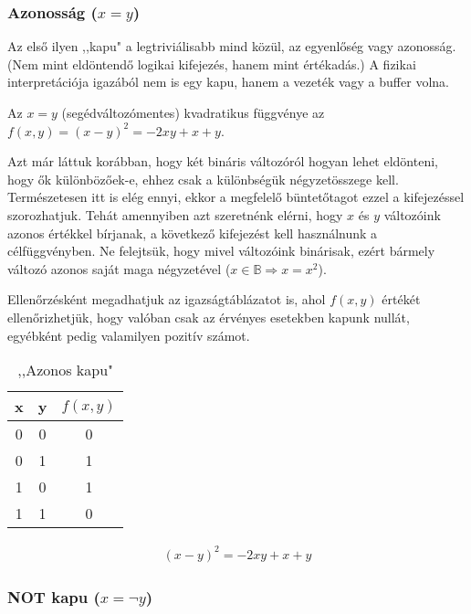 \subsubsection{Azonosság ($x=y$)}

Az első ilyen ,,kapu" a legtriviálisabb mind közül, az egyenlőség vagy azonosság. (Nem mint eldöntendő logikai kifejezés, hanem mint értékadás.) A fizikai interpretációja igazából nem is egy kapu, hanem a vezeték vagy a buffer volna. 

\begin{allitas}
	Az $x=y$ (segédváltozómentes) kvadratikus függvénye az $f(x,y)=(x-y)^2=-2xy+x+y$.
	
	Azt már láttuk korábban, hogy két bináris változóról hogyan lehet eldönteni, hogy ők különbözőek-e, ehhez csak a különbségük négyzetösszege kell. Természetesen itt is elég ennyi, ekkor a megfelelő büntetőtagot ezzel a kifejezéssel szorozhatjuk. Tehát amennyiben azt szeretnénk elérni, hogy $x$ és $y$ változóink azonos értékkel bírjanak, a következő kifejezést kell használnunk a célfüggvényben. Ne felejtsük, hogy mivel változóink binárisak, ezért bármely változó azonos saját maga négyzetével ($x \in \mathbb{B} \Rightarrow x = x^2$).	
\end{allitas}
	
	Ellenőrzésként megadhatjuk az igazságtáblázatot is, ahol $f(x,y)$ értékét ellenőrizhetjük, hogy valóban csak az érvényes esetekben kapunk nullát, egyébként pedig valamilyen pozitív számot.
	\begin{table}[ht]
		\footnotesize
		\centering
		\begin{tabular}{ c c c }
			\toprule
			x & y & $f(x,y)$ \\
			\midrule
			0 & 0 & 0 \\
			0 & 1 & 1 \\
			1 & 0 & 1 \\
			1 & 1 & 0 \\		
			\bottomrule
		\end{tabular}
		\caption{,,Azonos kapu"}
		\label{tab:SAMEgate}
	\end{table}	



\begin{align}
	(x-y)^2=-2xy+x+y
\end{align}



\subsubsection{NOT kapu ($x= \neg y$)}

